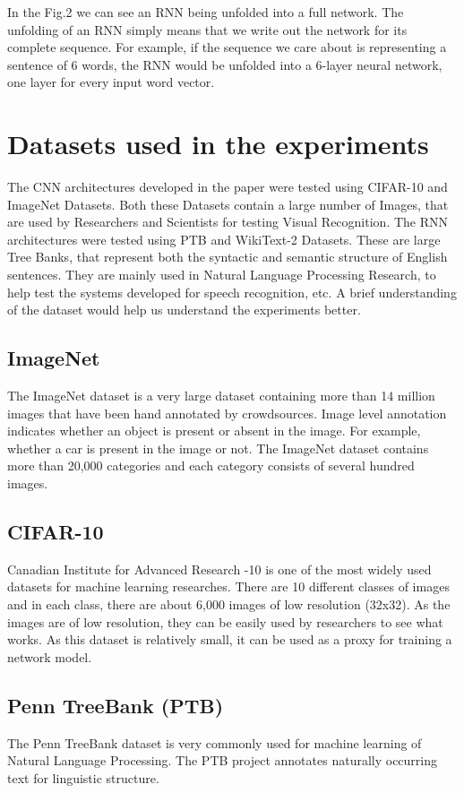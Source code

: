 \documentclass{ieee}
\begin{document}
In the Fig.2 we can see an RNN being unfolded into a full network. The unfolding of an RNN simply means that we write out the network for its complete sequence. For example, if the sequence we care about is representing a sentence of 6 words, the RNN would be unfolded into a 6-layer neural network, one layer for every input word vector.

\section{Datasets used in the experiments}
The CNN architectures developed in the paper were tested using CIFAR-10 and ImageNet Datasets. Both these Datasets contain a large number of Images, that are used by Researchers and Scientists for testing Visual Recognition.  The RNN architectures were tested using PTB and WikiText-2 Datasets. These are large Tree Banks, that represent both the syntactic and semantic structure of English sentences. They are mainly used in Natural Language Processing Research, to help test the systems developed for speech recognition, etc. A brief understanding of the dataset would help us understand the experiments better.
\subsection{ImageNet}
The ImageNet dataset is a very large dataset containing more than 14 million images that have been hand annotated by crowdsources. Image level annotation indicates whether an object is present or absent in the image. For example, whether a car is present in the image or not. The ImageNet dataset contains more than 20,000 categories and each category consists of several hundred images.
\subsection{CIFAR-10}
Canadian Institute for Advanced Research -10 is one of the most widely used datasets for machine learning researches. There are 10 different classes of images and in each class, there are about 6,000 images of low resolution (32x32). As the images are of low resolution, they can be easily used by researchers to see what works. As this dataset is relatively small, it can be used as a proxy for training a network model.
\subsection{Penn TreeBank (PTB)}
The Penn TreeBank dataset is very commonly used for machine learning of Natural Language Processing. The PTB project annotates naturally occurring text for linguistic structure.
\end{document}
